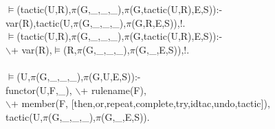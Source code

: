 \documentclass[11pt]{report}
\begin{document}
\begin{itemize}
\begin{sf}\begin{tabbing}
$\models$(tactic(U,R),$\pi$(G,\_\hspace{0.1em},\_\hspace{0.1em},\_\hspace{0.1em}),$\pi$(G,tactic(U,R),E,S)):- \\[-0.15ex]
\hspace{2em}var(R),tactic(U,$\pi$(G,\_\hspace{0.1em},\_\hspace{0.1em},\_\hspace{0.1em}),$\pi$(G,R,E,S)),!.\\[-0.15ex]
$\models$(tactic(U,R),$\pi$(G,\_\hspace{0.1em},\_\hspace{0.1em},\_\hspace{0.1em}),$\pi$(G,tactic(U,R),E,S)):-\\[-0.15ex]
\hspace{2em}$\backslash$+ var(R),$\models$(R,$\pi$(G,\_\hspace{0.1em},\_\hspace{0.1em},\_\hspace{0.1em}),$\pi$(G,\_\hspace{0.1em},E,S)),!.\\[-0.15ex]
\hspace{0em}\\[-0.15ex]
$\models$(U,$\pi$(G,\_\hspace{0.1em},\_\hspace{0.1em},\_\hspace{0.1em}),$\pi$(G,U,E,S)):-\\[-0.15ex]
\hspace{2em}functor(U,F,\_\hspace{0.1em}), $\backslash$+ rulename(F), \\[-0.15ex]
\hspace{2em}$\backslash$+ member(F, [then,or,repeat,complete,try,idtac,undo,tactic]),\\[-0.15ex]
\hspace{2em}tactic(U,$\pi$(G,\_\hspace{0.1em},\_\hspace{0.1em},\_\hspace{0.1em}),$\pi$(G,\_\hspace{0.1em},E,S)).\\[-0.7ex]

\end{tabbing}\end{sf}


\end{itemize}
\end{document}

